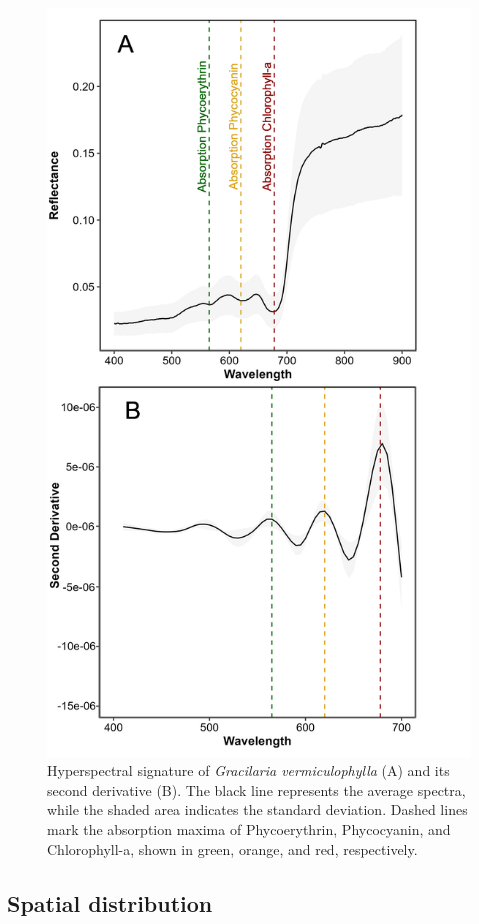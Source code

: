 \documentclass[
  letterpaper,
  11pt,
  english,
  singlespacing,
  headsepline]{MastersDoctoralThesis}
\begin{document}
\begin{spacing}{1.5}
\begin{figure}
{\includegraphics[width=0.9\linewidth,height=\textheight,keepaspectratio]{Chapter4/Figs/plot_spectral_signature.png}

}

\caption{\label{fig-SpecDescri}Hyperspectral signature of
\emph{Gracilaria vermiculophylla} (A) and its second derivative (B). The
black line represents the average spectra, while the shaded area
indicates the standard deviation. Dashed lines mark the absorption
maxima of Phycoerythrin, Phycocyanin, and Chlorophyll-a, shown in green,
orange, and red, respectively.}

\end{figure}%

\subsection{Spatial distribution}\label{spatial-distribution}


\end{spacing}
\end{document}
